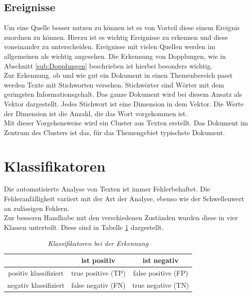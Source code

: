 \documentclass[twoside,a4paper]{article}
\begin{document}
\subsection{Ereignisse}
Um eine Quelle besser nutzen zu können ist es von Vorteil diese einem Ereignis zuordnen zu können. Hierzu ist es wichtig Ereignisse zu erkennen und diese voneinander zu unterscheiden. Ereignisse mit vielen Quellen werden im allgemeinen als wichtig angesehen. Die Erkennung von Dopplungen, wie in Abschnitt \ref{sub:Dopplungen} beschrieben ist hierbei besonders wichtig.\\
Zur Erkennung, ob und wie gut ein Dokument in einen Themenbereich passt werden Texte mit Stichworten versehen. Stichwörter sind Wörter mit dem geringsten Informationsgehalt. Das ganze Dokument wird bei diesem Ansatz als Vektor dargestellt. Jedes Stichwort ist eine Dimension in dem Vektor. Die Werte der Dimension ist die Anzahl, die das Wort vorgekommen ist.\\
Mit dieser Vorgehensweise wird ein Cluster aus Texten erstellt. Das Dokument im Zentrum des Clusters ist das, für das Themengebiet typischste Dokument.


\section{Klassifikatoren}
Die automatisierte Analyse von Texten ist immer Fehlerbehaftet. Die Fehleranfälligkeit variiert mit der Art der Analyse, ebenso wie der Schwellenwert an zulässigen Fehlern.\\
Zur besseren Handhabe mit den verschiedenen Zuständen wurden diese in vier Klassen unterteilt. Diese sind in Tabelle \ref{tab:Klassifikator} dargestellt.

\begin{table}[htdp]
  \caption{\it Klassifikatoren bei der Erkennung}
  \begin{center}
    \begin{tabular}{|c|c|c|}\hline
      					& ist positiv 	& ist negativ \\\hline
       positiv klassifiziert & true positive (TP) & false positive (FP)\\\hline
       negativ klassifiziert & false negativ (FN) & true negative (TN)\\	  
     \hline
    \end{tabular}
  \end{center}
  \label{tab:Klassifikator}
\end{table}
\end{document}
